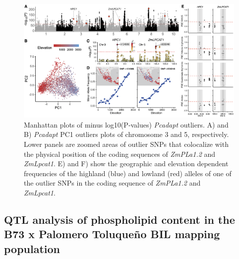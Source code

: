 \documentclass[9pt,twocolumn,twoside,lineno]{gsajnl}
\begin{document}
\begin{figure}[!ht]
\begin{center}
\includegraphics[width=0.4\paperwidth]{Figures/Fig_2.png}
\caption{Manhattan plots of minus log10(P‐values) \textit{Pcadapt} outliers. A) and B) \textit{Pcadapt} PC1 outliers plots of chromosome 3 and 5, respectively. 
Lower panels are zoomed areas of outlier SNPs that colocalize with the physical position of the coding sequences of \textit{ZmPLa1.2} and \textit{ZmLpcat1}. E) and F) show the geographic and elevation dependent frequencies of the highland (blue) and lowland (red) alleles of one of the outlier SNPs in the coding sequence of \textit{ZmPLa1.2} and \textit{ZmLpcat1}. 
}
\label{Fig2}
\end{center}
\end{figure} 

\subsection{QTL analysis of phospholipid content in the B73 x Palomero Toluqueño BIL mapping population} 
\end{document}
